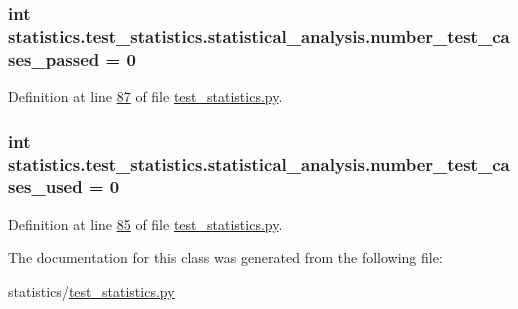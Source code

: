 \subsubsection[{number\+\_\+test\+\_\+cases\+\_\+passed}]{\setlength{\rightskip}{0pt plus 5cm}int statistics.\+test\+\_\+statistics.\+statistical\+\_\+analysis.\+number\+\_\+test\+\_\+cases\+\_\+passed = 0\hspace{0.3cm}{\ttfamily [static]}}\label{classstatistics_1_1test__statistics_1_1statistical__analysis_ac7555db570919cec38a8325d8427093e}


Definition at line \hyperlink{test__statistics_8py_source_l00087}{87} of file \hyperlink{test__statistics_8py_source}{test\+\_\+statistics.\+py}.

\hypertarget{classstatistics_1_1test__statistics_1_1statistical__analysis_afed7a27a010e7377d2719b315d5d5f17}{}
\subsubsection[{number\+\_\+test\+\_\+cases\+\_\+used}]{\setlength{\rightskip}{0pt plus 5cm}int statistics.\+test\+\_\+statistics.\+statistical\+\_\+analysis.\+number\+\_\+test\+\_\+cases\+\_\+used = 0\hspace{0.3cm}{\ttfamily [static]}}\label{classstatistics_1_1test__statistics_1_1statistical__analysis_afed7a27a010e7377d2719b315d5d5f17}


Definition at line \hyperlink{test__statistics_8py_source_l00085}{85} of file \hyperlink{test__statistics_8py_source}{test\+\_\+statistics.\+py}.



The documentation for this class was generated from the following file\+:\begin{DoxyCompactItemize}
\item 
statistics/\hyperlink{test__statistics_8py}{test\+\_\+statistics.\+py}\end{DoxyCompactItemize}

